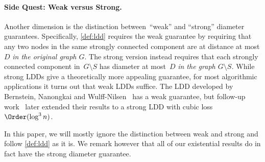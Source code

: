 \paragraph{Side Quest: Weak versus Strong.}
Another dimension is the distinction between~``weak'' and ``strong'' diameter guarantees. Specifically, \cref{def:ldd} requires the weak guarantee by requiring that any two nodes in the same strongly connected component are at distance at most $D$ \emph{in the original graph $G$}. The strong version instead requires that each strongly connected component in~$G \setminus S$ has diameter at most~$D$ \emph{in the graph $G \setminus S$.} While strong LDDs give a theoretically more appealing guarantee, for most algorithmic applications it turns out that weak LDDs suffice. The LDD developed by Bernstein, Nanongkai and Wulff-Nilsen~\cite{BernsteinNW22} has a weak guarantee, but follow-up work~\cite{BringmannCF23} later extended their results to a strong LDD with cubic loss $\Order(\log^3 n)$.

In this paper, we will mostly ignore the distinction between weak and strong and follow \cref{def:ldd} as it is. We remark however that all of our existential results do in fact have the strong diameter guarantee.